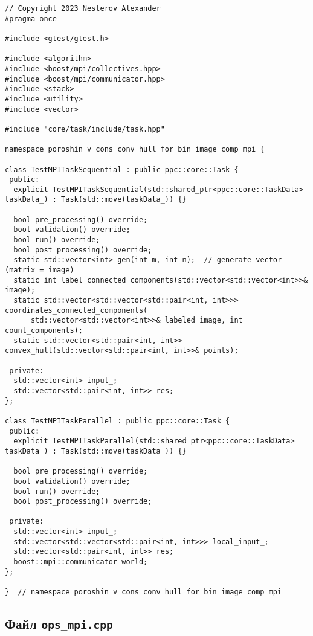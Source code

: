 \documentclass[12pt]{article}
\begin{document}
\begin{verbatim}
// Copyright 2023 Nesterov Alexander
#pragma once

#include <gtest/gtest.h>

#include <algorithm>
#include <boost/mpi/collectives.hpp>
#include <boost/mpi/communicator.hpp>
#include <stack>
#include <utility>
#include <vector>

#include "core/task/include/task.hpp"

namespace poroshin_v_cons_conv_hull_for_bin_image_comp_mpi {

class TestMPITaskSequential : public ppc::core::Task {
 public:
  explicit TestMPITaskSequential(std::shared_ptr<ppc::core::TaskData> taskData_) : Task(std::move(taskData_)) {}

  bool pre_processing() override;
  bool validation() override;
  bool run() override;
  bool post_processing() override;
  static std::vector<int> gen(int m, int n);  // generate vector (matrix = image)
  static int label_connected_components(std::vector<std::vector<int>>& image);
  static std::vector<std::vector<std::pair<int, int>>> coordinates_connected_components(
      std::vector<std::vector<int>>& labeled_image, int count_components);
  static std::vector<std::pair<int, int>> convex_hull(std::vector<std::pair<int, int>>& points);

 private:
  std::vector<int> input_;
  std::vector<std::pair<int, int>> res;
};

class TestMPITaskParallel : public ppc::core::Task {
 public:
  explicit TestMPITaskParallel(std::shared_ptr<ppc::core::TaskData> taskData_) : Task(std::move(taskData_)) {}

  bool pre_processing() override;
  bool validation() override;
  bool run() override;
  bool post_processing() override;

 private:
  std::vector<int> input_;
  std::vector<std::vector<std::pair<int, int>>> local_input_;
  std::vector<std::pair<int, int>> res;
  boost::mpi::communicator world;
};

}  // namespace poroshin_v_cons_conv_hull_for_bin_image_comp_mpi
\end{verbatim}

\subsection*{Файл \texttt{ops\_mpi.cpp}}
\end{document}
